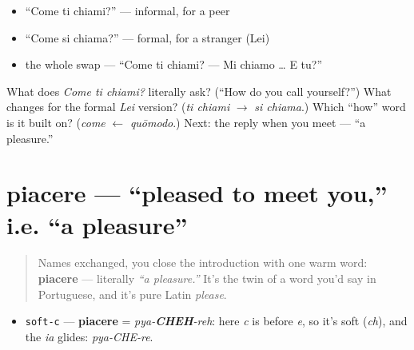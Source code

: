 \begin{itemize}
\raggedright
  \item \textquotedblleft{}Come ti chiami?\textquotedblright{} — informal, for a peer
  \item \textquotedblleft{}Come si chiama?\textquotedblright{} — formal, for a stranger (Lei)
  \item the whole swap — \textquotedblleft{}Come ti chiami? — Mi chiamo … E tu?\textquotedblright{}
\end{itemize}

\begin{tcolorbox}[breakable,colback=teal!4,colframe=teal!35!black,title={Before you move on}]
What does \emph{Come ti chiami?} literally ask? (\textquotedblleft{}How do you call yourself?\textquotedblright{}) What changes for the formal \emph{Lei} version? (\emph{ti chiami} $\to$ \emph{si chiama}.) Which \textquotedblleft{}how\textquotedblright{} word is it built on? (\emph{come} $\leftarrow$ \emph{quōmodo}.) Next: the reply when you meet — \textquotedblleft{}a pleasure.\textquotedblright{}
\end{tcolorbox}
\section[piacere]{piacere — \textquotedblleft{}pleased to meet you,\textquotedblright{} i.e. \textquotedblleft{}a pleasure\textquotedblright{}}

\label{lesson:IT-C03-piacere}



\begin{quote}
Names exchanged, you close the introduction with one warm word: \textbf{piacere} — literally \emph{\textquotedblleft{}a pleasure.\textquotedblright{}} It's the twin of a word you'd say in Portuguese, and it's pure Latin \emph{please}.
\end{quote}

\begin{sounds}
\begin{itemize}
\raggedright
  \item \texttt{soft-c} — \textbf{piacere} = \emph{pya-\textbf{CHEH}-reh}: here \emph{c} is before \emph{e}, so it's soft (\emph{ch}), and the \emph{ia} glides: \emph{pya-CHE-re}.
\end{itemize}
\end{sounds}


